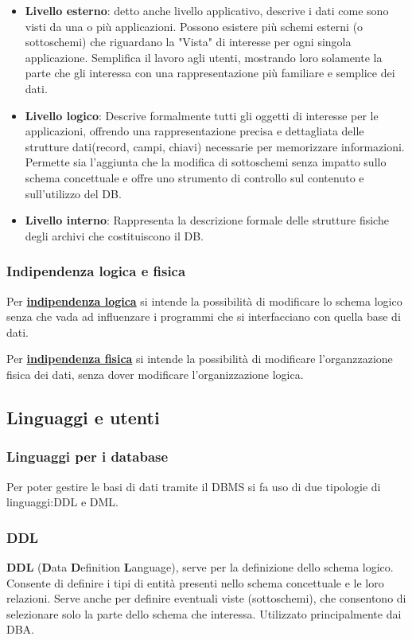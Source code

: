 \documentclass{article}
\begin{document}
\begin{itemize}
    \item \textbf{Livello esterno}: detto anche livello applicativo, descrive i dati come sono visti da una o più applicazioni. Possono esistere più schemi esterni (o sottoschemi) che riguardano la "Vista" di interesse per ogni singola applicazione. Semplifica il lavoro agli utenti, mostrando loro solamente la parte che gli interessa con una rappresentazione più familiare e semplice dei dati.
    \item \textbf{Livello logico}: Descrive formalmente tutti gli oggetti di interesse per le applicazioni, offrendo una rappresentazione precisa e dettagliata delle strutture dati(record, campi, chiavi) necessarie per memorizzare informazioni. Permette sia l'aggiunta che la modifica di sottoschemi senza impatto sullo schema concettuale e offre uno strumento di controllo sul contenuto e sull'utilizzo del DB.
    \item \textbf{Livello interno}: Rappresenta la descrizione formale delle strutture fisiche degli archivi che costituiscono il DB.
\end{itemize}

\subsubsection{Indipendenza logica e fisica}
Per \underline{\textbf{indipendenza logica}} si intende la possibilità di modificare lo schema logico senza che vada ad  influenzare i programmi che si interfacciano con quella base di dati.
%

Per \underline{\textbf{indipendenza fisica}} si intende la possibilità di modificare l'organzzazione fisica dei dati, senza dover modificare l'organizzazione logica.

\subsection{Linguaggi e utenti}
\subsubsection{Linguaggi per i database}
Per poter gestire le basi di dati tramite il DBMS si fa uso di due tipologie di linguaggi:DDL e DML.
\subsubsection{DDL}
\textbf{DDL} (\textbf{D}ata \textbf{D}efinition \textbf{L}anguage), serve per la definizione dello schema logico. Consente di definire i tipi di entità presenti nello schema concettuale e le loro relazioni. Serve anche per definire eventuali viste (sottoschemi), che consentono di selezionare solo la parte dello schema che interessa. Utilizzato principalmente dai DBA.
\end{document}
